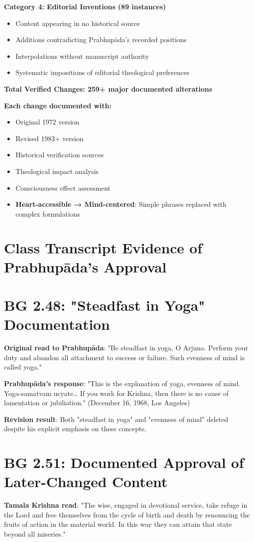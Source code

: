 \documentclass[11pt,twoside]{book}
\begin{document}
\textbf{\textbf{Category 4: Editorial Inventions (89 instances)}}
\begin{itemize}
\item Content appearing in no historical source
\item Additions contradicting Prabhupāda's recorded positions
\item Interpolations without manuscript authority
\item Systematic impositions of editorial theological preferences
\end{itemize}

\textbf{\textbf{Total Verified Changes: 259+ major documented alterations}}

\textbf{Each change documented with:}
\begin{itemize}
\item Original 1972 version
\item Revised 1983+ version
\item Historical verification sources
\item Theological impact analysis
\item Consciousness effect assessment
\item \textbf{\textbf{Heart-accessible → Mind-centered}}: Simple phrases replaced with complex formulations
\end{itemize}
\section*{Class Transcript Evidence of Prabhupāda's Approval}
\label{sec:org27dfeaa}

\section*{BG 2.48: "Steadfast in Yoga" Documentation}
\label{sec:org2a70c1a}
\textbf{\textbf{Original read to Prabhupāda}}: "Be steadfast in yoga, O Arjuna. Perform your duty and abandon all attachment to success or failure. Such evenness of mind is called yoga."

\textbf{\textbf{Prabhupāda's response}}: "This is the explanation of yoga, evenness of mind. Yoga-samatvam ucyate\ldots{} If you work for Krishna, then there is no cause of lamentation or jubiliation." (December 16, 1968, Los Angeles)

\textbf{\textbf{Revision result}}: Both "steadfast in yoga" and "evenness of mind" deleted despite his explicit emphasis on these concepts.
\section*{BG 2.51: Documented Approval of Later-Changed Content}
\label{sec:orga05b35b}
\textbf{\textbf{Tamala Krishna read}}: "The wise, engaged in devotional service, take refuge in the Lord and free themselves from the cycle of birth and death by renouncing the fruits of action in the material world. In this way they can attain that state beyond all miseries."
\end{document}
